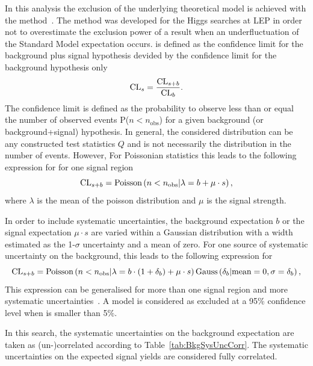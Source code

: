 In this analysis the exclusion of the underlying theoretical model is achieved with the \CLs method~\cite{bib:CLS_1999,bib:CLS_2000,bib:CLS_2002}.
The \CLs method was developed for the Higgs searches at LEP in order not to overestimate the exclusion power of a result when an  underfluctuation of the Standard Model expectation occurs.
\CLs is defined as the confidence limit for the background plus signal hypothesis devided by the confidence limit for the background hypothesis only
\begin{equation*}
\text{CL}_{s} = \frac{\text{CL}_{s+b}}{\text{CL}_{b}}.
\end{equation*}
The confidence limit is defined as the probability to observe less than or equal the number of observed events P($n<n_{\text{obs}}$) for a given background (or background+signal) hypothesis.
In general, the considered distribution can be any constructed test statistics $Q$ and is not necessarily the distribution in the number of events.
However, For Poissonian statistics this leads to the following expression for \CLsb for one signal region
\begin{equation*}
\text{CL}_{s+b} = \text{Poisson}\left( n<n_{\text{obs}} |\lambda = b+\mu\cdot s   \right),
\end{equation*}
where $\lambda$ is the mean of the poisson distribution and $\mu$ is the signal strength.

In order to include systematic uncertainties, the background expectation $b$ or the signal expectation $\mu\cdot s$ are varied within a Gaussian distribution with a width estimated as the 1-$\sigma$ uncertainty and a mean of zero.
For one source of systematic uncertainty on the background, this leads to the following expression for \CLsb
\begin{equation*}
\text{CL}_{s+b} = \text{Poisson}\left( n<n_{\text{obs}} |\lambda = b \cdot (1+\delta_b)+\mu\cdot s   \right) \text{Gauss}\left(\delta_b|\text{mean}=0, \sigma = \delta_b\right),
\end{equation*}
This expression can be generalised for more than one signal region and more systematic uncertainties~\cite{bib:Ott_Thesis}.
A model is considered as excluded at a 95\% confidence level when \CLs is smaller than 5\%.



In this search, the systematic uncertainties on the background expectation are taken as (un-)correlated according to Table~\ref{tab:BkgSysUncCorr}.
The systematic uncertainties on the expected signal yields are considered fully correlated.

